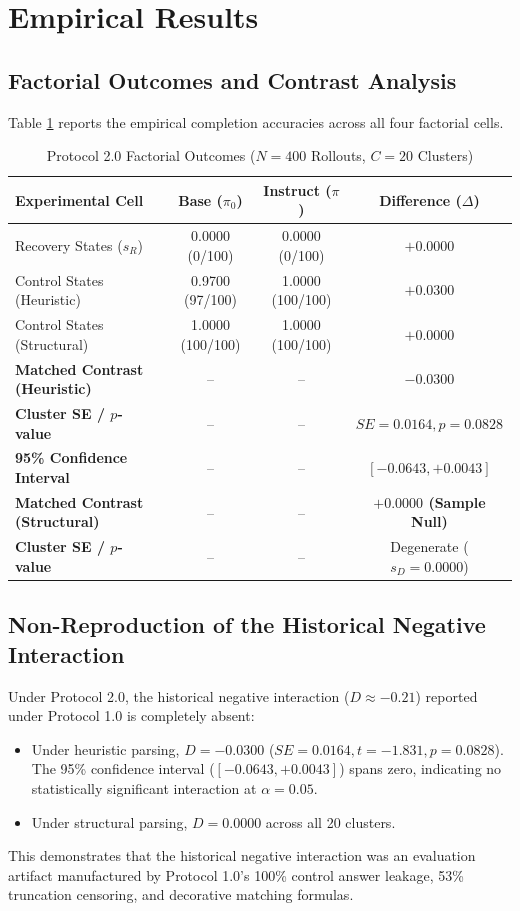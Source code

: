 \documentclass[11pt,letterpaper]{article}
\begin{document}
\section{Empirical Results}

\subsection{Factorial Outcomes and Contrast Analysis}
Table \ref{tab:outcomes} reports the empirical completion accuracies across all four factorial cells.

\begin{table}[htbp]
\centering
\small
\caption{Protocol 2.0 Factorial Outcomes ($N=400$ Rollouts, $C=20$ Clusters)}
\label{tab:outcomes}
\begin{tabular}{lccc}
\toprule
\textbf{Experimental Cell} & \textbf{Base ($\pi_0$)} & \textbf{Instruct ($\pi$)} & \textbf{Difference ($\Delta$)} \\
\midrule
Recovery States ($s_R$) & 0.0000 (0/100) & 0.0000 (0/100) & $+0.0000$ \\
Control States (Heuristic) & 0.9700 (97/100) & 1.0000 (100/100) & $+0.0300$ \\
Control States (Structural) & 1.0000 (100/100) & 1.0000 (100/100) & $+0.0000$ \\
\midrule
\textbf{Matched Contrast (Heuristic)} & -- & -- & \textbf{$-0.0300$} \\
\textbf{Cluster SE / $p$-value} & -- & -- & $SE = 0.0164, p = 0.0828$ \\
\textbf{95\% Confidence Interval} & -- & -- & $[-0.0643, +0.0043]$ \\
\midrule
\textbf{Matched Contrast (Structural)} & -- & -- & \textbf{$+0.0000$ (Sample Null)} \\
\textbf{Cluster SE / $p$-value} & -- & -- & Degenerate ($s_D = 0.0000$) \\
\bottomrule
\end{tabular}
\end{table}

\subsection{Non-Reproduction of the Historical Negative Interaction}
Under Protocol 2.0, the historical negative interaction ($D \approx -0.21$) reported under Protocol 1.0 is completely absent:
\begin{itemize}
    \item Under heuristic parsing, $D = -0.0300$ ($SE = 0.0164, t = -1.831, p = 0.0828$). The 95\% confidence interval ($[-0.0643, +0.0043]$) spans zero, indicating no statistically significant interaction at $\alpha = 0.05$.
    \item Under structural parsing, $D = 0.0000$ across all 20 clusters.
\end{itemize}
This demonstrates that the historical negative interaction was an evaluation artifact manufactured by Protocol 1.0's 100\% control answer leakage, 53\% truncation censoring, and decorative matching formulas.
\end{document}

